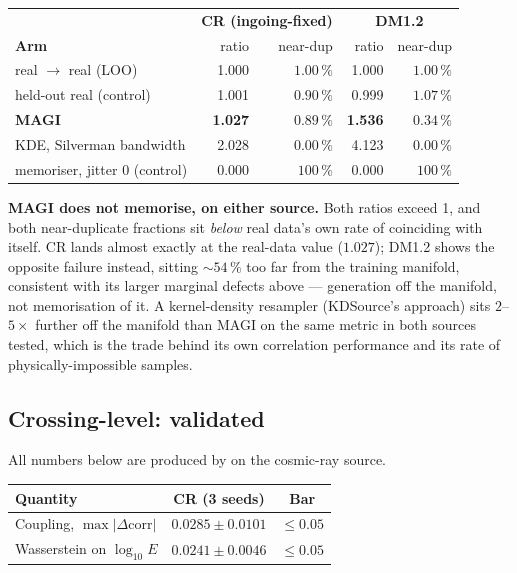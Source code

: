 \documentclass[11pt,a4paper]{article}
\begin{document}
\begin{center}
\begin{tabular}{@{}lrrrr@{}}
\toprule
 & \multicolumn{2}{c}{\textbf{CR (ingoing-fixed)}} & \multicolumn{2}{c}{\textbf{DM1.2}} \\
\textbf{Arm} & ratio & near-dup & ratio & near-dup \\
\midrule
real $\to$ real (LOO)         & 1.000 & $1.00\,\%$ & 1.000 & $1.00\,\%$ \\
held-out real (control)       & 1.001 & $0.90\,\%$ & 0.999 & $1.07\,\%$ \\
\textbf{MAGI}                 & \textbf{1.027} & $\mathbf{0.89\,\%}$ & \textbf{1.536} & $\mathbf{0.34\,\%}$ \\
KDE, Silverman bandwidth      & 2.028 & $0.00\,\%$ & 4.123 & $0.00\,\%$ \\
memoriser, jitter 0 (control) & 0.000 & $100\,\%$  & 0.000 & $100\,\%$  \\
\bottomrule
\end{tabular}
\end{center}

\textbf{MAGI does not memorise, on either source.} Both ratios exceed 1, and
both near-duplicate fractions sit \emph{below} real data's own rate of
coinciding with itself. CR lands almost exactly at the real-data value
($1.027$); DM1.2 shows the opposite failure instead, sitting $\sim$$54\,\%$ too
far from the training manifold, consistent with its larger marginal defects
above --- generation off the manifold, not memorisation of it. A kernel-density
resampler (KDSource's approach) sits $2$--$5\times$ further off the manifold
than MAGI on the same metric in both sources tested, which is the trade behind
its own correlation performance and its rate of physically-impossible samples.

\subsection{Crossing-level: validated}
\label{sec:crossing-validated}

All numbers below are produced by  on the
cosmic-ray source.

\begin{center}
\begin{tabular}{@{}lcc@{}}
\toprule
\textbf{Quantity} & \textbf{CR} (3 seeds) & \textbf{Bar} \\
\midrule
Coupling, $\max|\Delta\mathrm{corr}|$ & $0.0285 \pm 0.0101$ & $\leq 0.05$ \\
Wasserstein on $\log_{10}E$           & $0.0241 \pm 0.0046$ & $\leq 0.05$ \\
\bottomrule
\end{tabular}
\end{center}
\end{document}
